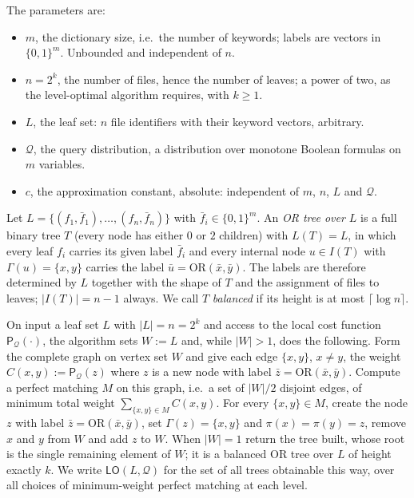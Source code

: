 \documentclass{conjura-conjecture}
\newcommand{\bits}{\{0,1\}}
\newcommand{\Qd}{\mathcal{Q}}
\newcommand{\ORv}{\mathrm{OR}}
\newcommand{\Pcost}{\mathsf{P}}
\newcommand{\LO}{\mathsf{LO}}
\begin{document}
The parameters are:
\begin{itemize}
\item $m$, the dictionary size, i.e.\ the number of keywords; labels are
  vectors in $\bits^m$. Unbounded and independent of $n$.
\item $n = 2^{k}$, the number of files, hence the number of leaves; a power
  of two, as the level-optimal algorithm requires, with $k \ge 1$.
\item $L$, the leaf set: $n$ file identifiers with their keyword vectors,
  arbitrary.
\item $\Qd$, the query distribution, a distribution over monotone Boolean
  formulas on $m$ variables.
\item $c$, the approximation constant, absolute: independent of $m$, $n$,
  $L$ and $\Qd$.
\end{itemize}

\begin{definition}\label{def:ortree}
Let $L = \{(f_1,\bar f_1),\dots,(f_n,\bar f_n)\}$ with
$\bar f_i \in \bits^{m}$. An \emph{OR tree over $L$} is a full binary tree
$T$ (every node has either $0$ or $2$ children) with $L(T) = L$, in which
every leaf $f_i$ carries its given label $\bar f_i$ and every internal node
$u \in I(T)$ with $\Gamma(u) = \{x,y\}$ carries the label
$\bar u = \ORv(\bar x, \bar y)$. The labels are therefore determined by $L$
together with the shape of $T$ and the assignment of files to leaves;
$|I(T)| = n - 1$ always. We call $T$ \emph{balanced} if its height is at
most $\lceil \log n \rceil$.
\end{definition}

\begin{definition}[the level-optimal algorithm $\LO$]\label{def:lo}
On input a leaf set $L$ with $|L| = n = 2^k$ and access to the local cost
function $\Pcost_{\Qd}(\cdot)$, the algorithm sets $W := L$ and, while
$|W| > 1$, does the following. Form the complete graph on vertex set $W$
and give each edge $\{x,y\}$, $x \neq y$, the weight
$C(x,y) := \Pcost_{\Qd}(z)$ where $z$ is a new node with label
$\bar z = \ORv(\bar x, \bar y)$. Compute a perfect matching $M$ on this
graph, i.e.\ a set of $|W|/2$ disjoint edges, of minimum total weight
$\sum_{\{x,y\} \in M} C(x,y)$. For every $\{x,y\} \in M$, create the node
$z$ with label $\bar z = \ORv(\bar x, \bar y)$, set $\Gamma(z) = \{x,y\}$
and $\pi(x) = \pi(y) = z$, remove $x$ and $y$ from $W$ and add $z$ to $W$.
When $|W| = 1$ return the tree built, whose root is the single remaining
element of $W$; it is a balanced OR tree over $L$ of height exactly $k$. We
write $\LO(L,\Qd)$ for the set of all trees obtainable this way, over all
choices of minimum-weight perfect matching at each level.
\end{definition}
\end{document}
